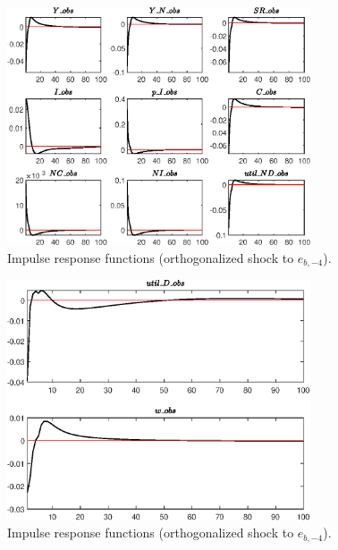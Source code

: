 \begin{figure}[H]
\centering 
\includegraphics[width=0.80\textwidth]{RBC_sectoral/graphs/RBC_sectoral_IRF_e_b_news1}
\caption{Impulse response functions (orthogonalized shock to ${e_{b,-4}}$).}\label{Fig:IRF:e_b_news:1}
\end{figure}
 
\begin{figure}[H]
\centering 
\includegraphics[width=0.80\textwidth]{RBC_sectoral/graphs/RBC_sectoral_IRF_e_b_news2}
\caption{Impulse response functions (orthogonalized shock to ${e_{b,-4}}$).}\label{Fig:IRF:e_b_news:2}
\end{figure}
 
